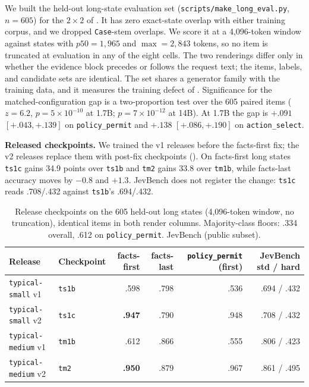 We built the held-out long-state evaluation set (\texttt{scripts/make\_long\_eval.py}, $n{=}605$) for
the $2\times2$ of . It has zero exact-state overlap with either training corpus, and
we dropped \texttt{Case}-stem overlaps. We score it at a 4{,}096-token window against states with
$p50 = 1{,}965$ and $\max = 2{,}843$ tokens, so no item is truncated at evaluation in any of the eight
cells. The two renderings differ only in whether the evidence block precedes or follows the request
text; the items, labels, and candidate sets are identical. The set shares a generator family with the
training data, and it measures the training defect of . Significance for the
matched-configuration gap is a two-proportion test over the 605 paired items ($z = 6.2$,
$p = 5\times10^{-10}$ at 1.7B; $p = 7\times10^{-12}$ at 14B). At 1.7B the gap is $+.091$
$[+.043, +.139]$ on \texttt{policy\_permit} and $+.138$ $[+.086, +.190]$ on \texttt{action\_select}.

\textbf{Released checkpoints.} We trained the v1 releases before the facts-first fix; the v2 releases
replace them with post-fix checkpoints (). On facts-first long
states \texttt{ts1c} gains 34.9 points over \texttt{ts1b} and \texttt{tm2} gains 33.8 over
\texttt{tm1b}, while facts-last accuracy moves by $-0.8$ and $+1.3$. JevBench does not register the
change: \texttt{ts1c} reads .708/.432 against \texttt{ts1b}'s .694/.432.

\begin{table}[h]
  \centering
  \caption{Release checkpoints on the 605 held-out long states (4{,}096-token window, no truncation),
  identical items in both render columns. Majority-class floors: .334 overall, .612 on
  \texttt{policy\_permit}. JevBench (public subset).}
  \label{tab:app-long-release}
  \small
  \setlength{\tabcolsep}{4pt}
  \begin{tabular}{llrrrr}
    \toprule
    Release & Checkpoint & facts-first & facts-last & \texttt{policy\_permit} (first) & JevBench std / hard \\
    \midrule
    \texttt{typical-small} v1 & \texttt{ts1b} & .598 & .798 & .536 & .694 / .432 \\
    \texttt{typical-small} v2 & \texttt{ts1c} & \textbf{.947} & .790 & .948 & .708 / .432 \\
    \texttt{typical-medium} v1 & \texttt{tm1b} & .612 & .866 & .555 & .806 / .423 \\
    \texttt{typical-medium} v2 & \texttt{tm2} & \textbf{.950} & .879 & .967 & .861 / .495 \\
    \bottomrule
  \end{tabular}
\end{table}

